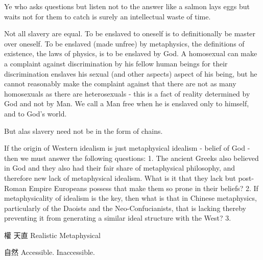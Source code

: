 Ye who asks questions but listen not to the answer like a salmon lays eggs but waits not for them to catch is surely an intellectual waste of time. 

Not all slavery are equal. To be enslaved to oneself is to definitionally be master over oneself. To be enslaved (made unfree) by metaphysics, the definitions of existence, the laws of physics, is to be enslaved by God. A homosexual can make a complaint against discrimination by his fellow human beings for their discrimination enslaves his sexual (and other aspects) aspect of his being, but he cannot reasonably make the complaint against that there are not as many homosexuals as there are heterosexuals - this is a fact of reality determined by God and not by Man. We call a Man free when he is enslaved only to himself, and to God's world. 




But alas slavery need not be in the form of chains. 



If the origin of Western idealism is just metaphysical idealism - belief of God - then we must answer the following questions: 
1. The ancient Greeks also believed in God and they also had their fair share of metaphysical philosophy, and therefore new lack of metaphysical idealism. What is it that they lack but post-Roman Empire Europeans possess that make them so prone in their beliefs?
2. If metaphysicality of idealism is the key, then what is that in Chinese metaphysics, particularly of the Daoists and the Neo-Confucianists, that is lacking thereby preventing it from generating a similar ideal structure with the West?
3. 

權 天直
Realistic 
Metaphysical 

自然
 Accessible. Inaccessible. 




